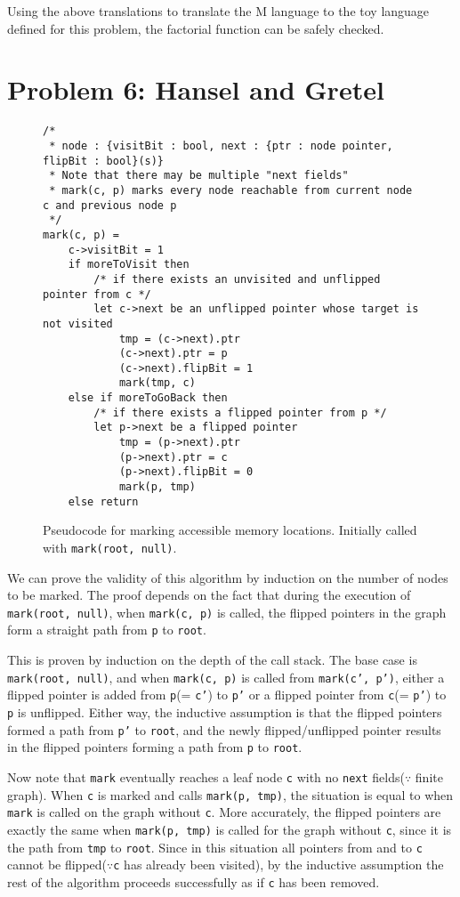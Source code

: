 \documentclass{article}
\begin{document}
Using the above translations to translate the M language to the toy language defined for this problem, the factorial function can be safely checked.

\section{Problem 6: Hansel and Gretel}
\begin{figure}[htb]
\centering
\begin{BVerbatim}
/* 
 * node : {visitBit : bool, next : {ptr : node pointer, flipBit : bool}(s)}
 * Note that there may be multiple "next fields"
 * mark(c, p) marks every node reachable from current node c and previous node p
 */
mark(c, p) =
    c->visitBit = 1
    if moreToVisit then 
        /* if there exists an unvisited and unflipped pointer from c */
        let c->next be an unflipped pointer whose target is not visited
            tmp = (c->next).ptr
            (c->next).ptr = p
            (c->next).flipBit = 1
            mark(tmp, c)
    else if moreToGoBack then
        /* if there exists a flipped pointer from p */
        let p->next be a flipped pointer
            tmp = (p->next).ptr
            (p->next).ptr = c
            (p->next).flipBit = 0
            mark(p, tmp)
    else return
\end{BVerbatim}
\caption{Pseudocode for marking accessible memory locations. Initially called with \texttt{mark(root, null)}.}
\end{figure}

We can prove the validity of this algorithm by induction on the number of nodes to be marked\cite{TAOCP}. The proof depends on the fact that during the execution of \texttt{mark(root, null)}, when \texttt{mark(c, p)} is called, the flipped pointers in the graph form a straight path from \texttt{p} to \texttt{root}. 

This is proven by induction on the depth of the call stack. The base case is \texttt{mark(root, null)}, and when \texttt{mark(c, p)} is called from \texttt{mark(c', p')}, either a flipped pointer is added from \texttt{p}(= \texttt{c'}) to \texttt{p'} or a flipped pointer from \texttt{c}(= \texttt{p'}) to \texttt{p} is unflipped. Either way, the inductive assumption is that the flipped pointers formed a path from \texttt{p'} to \texttt{root}, and the newly flipped/unflipped pointer results in the flipped pointers forming a path from \texttt{p} to \texttt{root}.

Now note that \texttt{mark} eventually reaches a leaf node \texttt{c} with no \texttt{next} fields($\because$ finite graph). When \texttt{c} is marked and calls \texttt{mark(p, tmp)}, the situation is equal to when \texttt{mark} is called on the graph without \texttt{c}. More accurately, the flipped pointers are exactly the same when \texttt{mark(p, tmp)} is called for the graph without \texttt{c}, since it is the path from \texttt{tmp} to \texttt{root}. Since in this situation all pointers from and to \texttt{c} cannot be flipped($\because$\texttt{c} has already been visited), by the inductive assumption the rest of the algorithm proceeds successfully as if \texttt{c} has been removed.
\printbibliography
\end{document}
